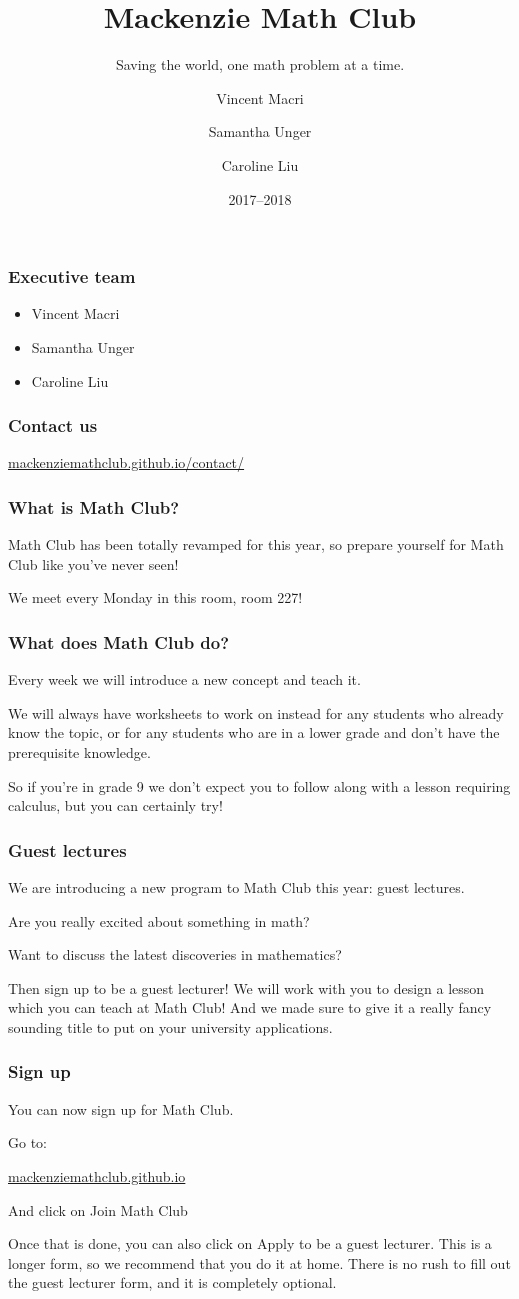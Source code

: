 \documentclass[mathserif]{beamer}
\title{Mackenzie Math Club}
\subtitle{Saving the world, one math problem at a time.}
\author{Vincent Macri \and Samantha Unger \and Caroline Liu}
\date{2017--2018}
\begin{document}
	\frame{\titlepage}
	\begin{frame}
		\frametitle{Executive team}
		\begin{itemize}
			\item Vincent Macri
			\item Samantha Unger
			\item Caroline Liu
		\end{itemize}
	\end{frame}
	\begin{frame}
		\frametitle{Contact us}
		\begin{center}
			\Large
			\url{mackenziemathclub.github.io/contact/}
		\end{center}
	\end{frame}
	\begin{frame}
		\frametitle{What is Math Club?}
		Math Club has been totally revamped for this year, so prepare yourself for Math Club like you've never seen!

		We meet every Monday in \alert{this} room, room 227!
	\end{frame}
	\begin{frame}
		\frametitle{What does Math Club do?}
		Every week we will introduce a new concept and teach it.
		\pause
		
		We will always have worksheets to work on instead for any students who already know the topic, or for any students who are in a lower grade and don't have the prerequisite knowledge.
		\pause

		So if you're in grade 9 we don't expect you to follow along with a lesson requiring calculus, but you can certainly try!
	\end{frame}
	\begin{frame}
		\frametitle{Guest lectures}
		We are introducing a new program to Math Club this year: guest lectures.
		\pause

		Are you really excited about something in math?
		\pause

		Want to discuss the latest discoveries in mathematics?
		\pause

		Then sign up to be a guest lecturer! We will work with you to design a lesson which you can teach at Math Club! And we made sure to give it a really fancy sounding title to put on your university applications.
	\end{frame}
	\begin{frame}
		\frametitle{Sign up}
		You can now sign up for Math Club.

		Go to:
		\begin{center}
			\huge
			\url{mackenziemathclub.github.io}
		\end{center}
		And click on \alert{Join Math Club}
		\pause

		Once that is done, you can also click on \alert{Apply to be a guest lecturer}. This is a longer form, so we recommend that you do it at home. There is no rush to fill out the guest lecturer form, and it is completely optional.
	\end{frame}
\end{document}

